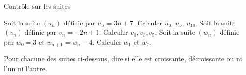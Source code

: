 \documentclass[11pt,addpoints]{exam}
\begin{document}
\begin{center}
    \Huge{Contrôle sur les suites}
\end{center}

\begin{questions}
\question[2]
\question[2]
\question[3] Soit la suite $(u_n)$ définie par $u_n = 3n+7$. Calculer $u_0$, $u_5$, $u_{10}$.
\question[3] Soit la suite $(v_n)$ définie par $v_n = -2n+1$. Calculer $v_0, v_3, v_5$.
\question[1] Soit la suite $(w_n)$ définie par $w_0 = 3$ et $w_{n+1} = w_n - 4$. Calculer $w_1$ et $w_2$.


\question[3] Pour chacune des suites ci-dessous, dire si elle est croissante, décroissante ou ni l'un ni l'autre.

\newcommand{\point}[2]
{
    \draw ($(#1,#2) + (-0.1,-0.1)$) -- ($(#1,#2) + (0.1,0.1)$) ($(#1,#2) + (-0.1,0.1)$) -- ($(#1,#2) + (0.1,-0.1)$); 
}


\end{questions}
\end{document}
